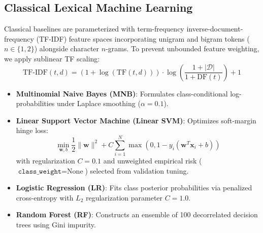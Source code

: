 \documentclass[11pt,a4paper]{article}
\begin{document}
\subsection{Classical Lexical Machine Learning}
Classical baselines are parameterized with term-frequency inverse-document-frequency (TF-IDF) feature spaces incorporating unigram and bigram tokens ($n \in \{1, 2\}$) alongside character $n$-grams. To prevent unbounded feature weighting, we apply sublinear TF scaling:
\begin{equation}
    \text{TF-IDF}(t, d) = (1 + \log(\text{TF}(t, d))) \cdot \log\left(\frac{1 + |\mathcal{D}|}{1 + \text{DF}(t)}\right) + 1
\end{equation}
\begin{itemize}
    \item \textbf{Multinomial Naive Bayes (MNB)}: Formulates class-conditional log-probabilities under Laplace smoothing ($\alpha = 0.1$).
    \item \textbf{Linear Support Vector Machine (Linear SVM)}: Optimizes soft-margin hinge loss:
    \begin{equation}
        \min_{\mathbf{w}, b} \frac{1}{2}\|\mathbf{w}\|^2 + C \sum_{i=1}^N \max(0, 1 - y_i(\mathbf{w}^T\mathbf{x}_i + b))
    \end{equation}
    with regularization $C = 0.1$ and unweighted empirical risk ($\texttt{class\_weight}=\text{None}$) selected from validation tuning.
    \item \textbf{Logistic Regression (LR)}: Fits class posterior probabilities via penalized cross-entropy with $L_2$ regularization parameter $C = 1.0$.
    \item \textbf{Random Forest (RF)}: Constructs an ensemble of 100 decorrelated decision trees using Gini impurity.
\end{itemize}
\end{document}
